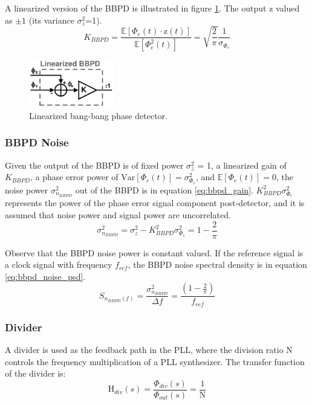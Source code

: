 			A linearized version of the BBPD is illustrated in figure \ref{fig:bbpd_linearized}. The output $\mathrm{z}$ valued as $\pm 1$ (its variance $\sigma_z^2$=1).
			\begin{equation}\label{eq:nom_bbpd_gain}
				K_{BBPD} = \frac{\mathbb{E}[\Phi_e(t)\cdot\mathrm{z}(t)]}{\mathbb{E}[\Phi_e^2(t)]} = \sqrt{\frac{2}{\pi}}\frac{1}{\sigma_{\Phi_e}}
			\end{equation}
			\begin{figure}[htb!]
				\center\includegraphics[width=0.33\textwidth, angle=0]{./figs/theory/bbpd_linearized}
				\caption{Linearized bang-bang phase detector.}
				\label{fig:bbpd_linearized}
			\end{figure}

			\subsubsection*{BBPD Noise}\label{sec:bbpd_noise}
			Given the output of the BBPD is of fixed power $\sigma_z^2$ = 1, a linearized gain of $K_{BBPD}$, a phase error power of $\mathrm{Var}[\Phi_e(t)] = \sigma_{\Phi_e}^2$, and $\mathbb{E}[\Phi_e(t)]=0$, the noise power  $\sigma_{n_{BBPD}}^2$ out of the BBPD is in equation \ref{eq:bbpd_gain}. $K_{BBPD}^2\sigma_{\Phi_e}^2$ represents the power of the phase error signal component post-detector, and it is assumed that noise power and signal power are uncorrelated.
			\begin{equation}\label{eq:bbpd_gain}
				\sigma_{n_{BBPD}}^2 = \sigma_z^2 - K_{BBPD}^2\sigma_{\Phi_e}^2 = 1-\frac{2}{\pi}
			\end{equation}


			Observe that the BBPD noise power is constant valued. If the reference signal is a clock signal with frequency $f_{ref}$, the BBPD noise spectral density is in equation \ref{eq:bbpd_noise_psd}.
			\begin{equation}\label{eq:bbpd_noise_psd}
				S_{ n_{BBPD}(f)} = \frac{\sigma_{n_{BBPD}}^2}{\Delta f} = \frac{\left(1-\frac{2}{\pi}\right)}{f_{ref}}
			\end{equation}



		\subsubsection{Divider}
			A divider is used as the feedback path in the PLL, where the division ratio N controls the frequency multiplication of a PLL synthesizer. The transfer function of the divider is:
			\begin{equation}
				\mathrm{H}_{div}(s) = \frac{\Phi_{div}(s)}{\Phi_{out}(s)} = \frac{1}{\mathrm{N}}
			\end{equation}


